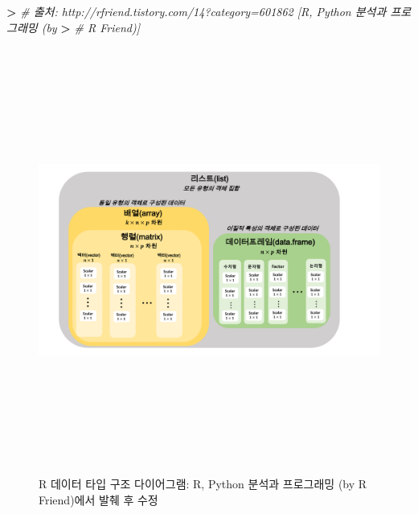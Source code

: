 \documentclass[11pt,a4paper]{book}
\newenvironment{Shaded}{\begin{snugshade}}{\end{snugshade}}
\newcommand{\StringTok}[1]{\textcolor[rgb]{0.31,0.60,0.02}{#1}}
\newcommand{\CommentTok}[1]{\textcolor[rgb]{0.56,0.35,0.01}{\textit{#1}}}
\newcommand{\OperatorTok}[1]{\textcolor[rgb]{0.81,0.36,0.00}{\textbf{#1}}}
\newcommand{\ErrorTok}[1]{\textcolor[rgb]{0.64,0.00,0.00}{\textbf{#1}}}
\theoremstyle{definition}
\theoremstyle{definition}
\theoremstyle{definition}
\theoremstyle{remark}
\begin{document}
\begin{Shaded}
\begin{Highlighting}[]
\OperatorTok{>}\StringTok{ }\CommentTok{# 출처: http://rfriend.tistory.com/14?category=601862 [R, Python 분석과 프로그래밍 (by}
\ErrorTok{>}\StringTok{ }\CommentTok{# R Friend)]}
\end{Highlighting}
\end{Shaded}

\normalsize

\begin{figure}[H] {
  \centering
  \includegraphics[width = 15cm, height = 14cm]{Figures/datatype-diagram}
  \caption[R 데이터 타입 구조 다이어그램]{R 데이터 타입 구조 다이어그램: R, Python 분석과 프로그래밍 (by R Friend)에서 발췌 후 수정}\label{fig:R-datatype}
} \end{figure}

\vspace{1cm}

\renewcommand\bibname{References}

\end{document}

